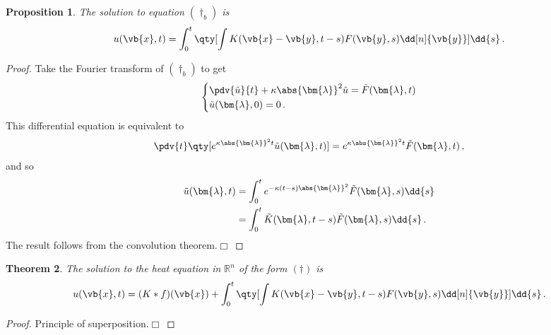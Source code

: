 \documentclass{article}
\theoremstyle{plain}\theoremheaderfont{\normalfont\itshape}\theorembodyfont{\rmfamily}\theoremseparator{.}\newtheorem*{rem}{Remark}\newtheorem*{ex}{Example}\newtheorem*{proof}{Proof}\newtheorem*{altp}{Alternative proof}
\theoremstyle{plain}\theoremheaderfont{\normalfont\bfseries}\theorembodyfont{\rmfamily}\theoremseparator{.}\newtheorem{thm}{Theorem}[section]\newtheorem{lem}[thm]{Lemma}\newtheorem{prop}[thm]{Proposition}\newtheorem*{cor}{Corollary}\newtheorem{defn}[thm]{Definition}\newtheorem{clm}[thm]{Claim}\newtheorem{clminproof}{Claim}
\theoremstyle{break}\theoremheaderfont{\normalfont\itshape}\theorembodyfont{\rmfamily}\theoremseparator{.\medskip}\newtheorem*{proofskip}{Proof}\newtheorem*{exs}{Examples}\newtheorem*{rems}{Remarks}
\theoremstyle{break}\theoremheaderfont{\normalfont\bfseries}\theorembodyfont{\rmfamily}\theoremseparator{.\medskip}\newtheorem{lemskip}[thm]{Lemma}\newtheorem{defnskip}[thm]{Definition}\newtheorem{propskip}[thm]{Proposition}\newtheorem{thmskip}[thm]{Theorem}
\numberwithin{equation}{section}
\newcommand{\qed}{\hfill\ensuremath{\Box}}
\newcommand{\bl}{\bm{\lambda}}
\begin{document}
	\begin{prop}
		The solution to equation \((\dagger_b)\) is
		\[u(\vb{x},t)=\int_{0}^{t}\qty[\int K(\vb{x}-\vb{y},t-s)F(\vb{y},s)\dd[n]{\vb{y}}]\dd{s}\,.\]
	\end{prop}
	\begin{proof}
		Take the Fourier transform of \((\dagger_b)\) to get
		\[\left\{\begin{aligned}
			&\pdv{\tilde{u}}{t}+\kappa\abs{\bl}^2\tilde{u}=\tilde{F}(\bl,t)\\
			&\tilde{u}(\bl,0)=0\,.
		\end{aligned}\right.\]
		This differential equation is equivalent to
		\[\pdv{t}\qty[e^{\kappa\abs{\bl}^2t}\tilde{u}(\bl,t)]=e^{\kappa\abs{\bl}^2t}\tilde{F}(\bl,t)\,,\]
		and so
		\begin{align*}
			\tilde{u}(\bl,t)&=\int_{0}^{t}e^{-\kappa(t-s)\abs{\bl}^2}\tilde{F}(\bl,s)\dd{s}\\
			&=\int_{0}^{t}\tilde{K}(\bl,t-s)\tilde{F}(\bl,s)\dd{s}\,.
		\end{align*}
		The result follows from the convolution theorem.\qed
	\end{proof}
	\begin{thm}
		The solution to the heat equation in \(\mathbb{R}^n\) of the form \((\dagger)\) is
		\[u(\vb{x},t)=(K*f)(\vb{x})+\int_{0}^{t}\qty[\int K(\vb{x}-\vb{y},t-s)F(\vb{y},s)\dd[n]{\vb{y}}]\dd{s}\,.\]
	\end{thm}
	\begin{proof}
		Principle of superposition.\qed
	\end{proof}
\end{document}
